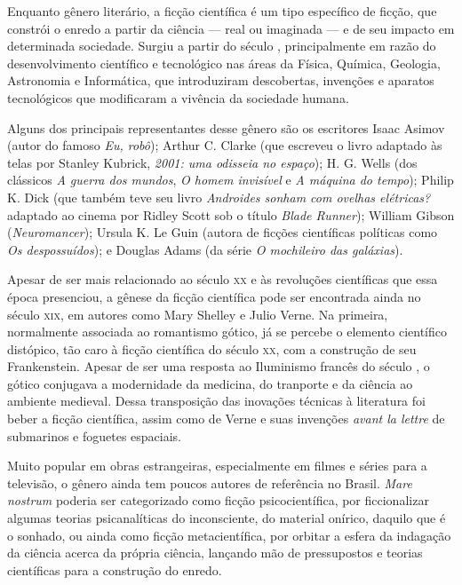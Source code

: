 Enquanto gênero literário, a ficção científica é um tipo específico de ficção, que constrói o enredo a partir da ciência --- real ou imaginada --- e de seu impacto em determinada sociedade. Surgiu a partir do século , principalmente em razão do desenvolvimento científico e tecnológico nas áreas da Física, Química, Geologia, Astronomia e Informática, que introduziram descobertas, invenções e aparatos tecnológicos que modificaram a vivência da sociedade humana.

Alguns dos principais representantes desse gênero são os escritores
Isaac Asimov (autor do famoso \textit{Eu, robô}); Arthur C. Clarke (que escreveu o livro adaptado às telas por Stanley Kubrick, \textit{2001: uma odisseia no espaço}); H. G. Wells (dos clássicos \textit{A guerra dos mundos}, \textit{O homem invisível} e \textit{A máquina do tempo}); Philip K. Dick (que também teve seu livro \textit{Androides sonham com ovelhas elétricas?} adaptado ao cinema por Ridley Scott sob o título \textit{Blade Runner}); William Gibson (\textit{Neuromancer}); Ursula K. Le Guin (autora de ficções científicas políticas como \textit{Os despossuídos}); e Douglas Adams (da série \textit{O mochileiro das galáxias}).

Apesar de ser mais relacionado ao século \textsc{xx} e às revoluções científicas que essa época presenciou, a gênese da ficção científica pode ser encontrada ainda no século \textsc{xix}, em autores como Mary Shelley e Julio Verne.
Na primeira, normalmente associada ao romantismo gótico, já se percebe o elemento científico distópico, tão caro à ficção científica do século \textsc{xx}, com a construção de seu Frankenstein.
Apesar de ser uma resposta ao Iluminismo francês do século , o gótico conjugava a modernidade da medicina, do tranporte e da ciência ao ambiente medieval.
Dessa transposição das inovações técnicas à literatura foi beber a ficção científica, assim como de Verne e suas invenções \textit{avant la lettre} de submarinos e foguetes espaciais.

Muito popular em obras estrangeiras, especialmente em filmes e séries para a televisão, o gênero ainda tem poucos autores de referência no Brasil. \emph{Mare nostrum} poderia ser categorizado como ficção psicocientífica, por ficcionalizar algumas teorias psicanalíticas do inconsciente, do material onírico, daquilo que é o sonhado, ou ainda como ficção metacientífica, por orbitar a esfera da indagação da ciência acerca da própria ciência, lançando mão de pressupostos e teorias científicas para a construção do enredo.

